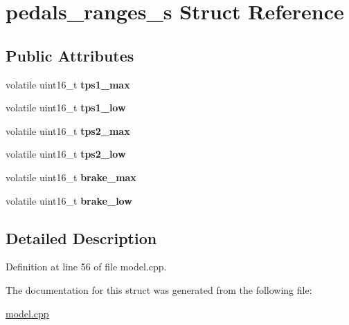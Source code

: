 \hypertarget{structpedals__ranges__s}{}\section{pedals\+\_\+ranges\+\_\+s Struct Reference}
\label{structpedals__ranges__s}
\subsection*{Public Attributes}
\begin{DoxyCompactItemize}
\item 
\mbox{\label{structpedals__ranges__s_a98f93ae82c752630b04dfeaa02b24bfe}} 
volatile uint16\+\_\+t {\bfseries tps1\+\_\+max}
\item 
\mbox{\label{structpedals__ranges__s_ad6112d8067a35ed1b1584e77f80c8074}} 
volatile uint16\+\_\+t {\bfseries tps1\+\_\+low}
\item 
\mbox{\label{structpedals__ranges__s_a86681aec2f96d375387b5cd88e3935c4}} 
volatile uint16\+\_\+t {\bfseries tps2\+\_\+max}
\item 
\mbox{\label{structpedals__ranges__s_ae57b941f48c04203b5eb5d6356c89544}} 
volatile uint16\+\_\+t {\bfseries tps2\+\_\+low}
\item 
\mbox{\label{structpedals__ranges__s_a8a182e36368cddc8656a1dcc90af2bc9}} 
volatile uint16\+\_\+t {\bfseries brake\+\_\+max}
\item 
\mbox{\label{structpedals__ranges__s_aaebf4904b44e1bbfe5ebe4f7f6020357}} 
volatile uint16\+\_\+t {\bfseries brake\+\_\+low}
\end{DoxyCompactItemize}


\subsection{Detailed Description}


Definition at line 56 of file model.\+cpp.



The documentation for this struct was generated from the following file\+:\begin{DoxyCompactItemize}
\item 
\mbox{\hyperlink{model_8cpp}{model.\+cpp}}\end{DoxyCompactItemize}
